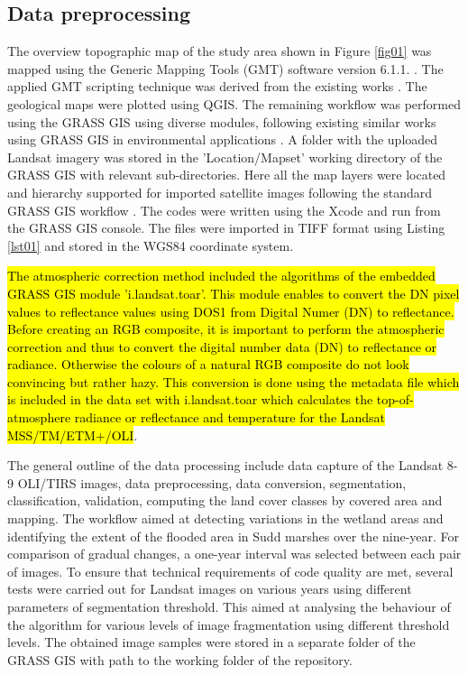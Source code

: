 \documentclass[analytics,article,submit,pdftex,moreauthors]{Definitions/mdpi}
\begin{document}
\subsection{Data preprocessing}

The overview topographic map of the study area shown in Figure \ref{fig01} was mapped using the Generic Mapping Tools (GMT) software version 6.1.1. \cite{Wessel}. The applied GMT scripting technique was derived from the existing works \cite{Lemenkova202203,data7060074}. The geological maps were plotted using QGIS. The remaining workflow was performed using the GRASS GIS using diverse modules, following existing similar works using GRASS GIS in environmental applications \cite{HOFIERKA201720,JASIEWICZ20111162,JASIEWICZ20111525,SOROKINE2007685}. A folder with the uploaded Landsat imagery was stored in the 'Location/Mapset' working directory of the GRASS GIS with relevant sub-directories. Here all the map layers were located and hierarchy supported for imported satellite images following the standard GRASS GIS workflow \cite{NETELER2012124}. The codes were written using the Xcode and run from the GRASS GIS console. The files were imported in TIFF format using Listing \ref{lst01} and stored in the WGS84 coordinate system. 

\hl{The atmospheric correction method included the algorithms of the embedded GRASS GIS module 'i.landsat.toar'. This module enables to convert the DN pixel values to reflectance values using DOS1 from Digital Numer (DN) to reflectance. Before creating an RGB composite, it is important to perform the atmospheric correction and thus to convert the digital number data (DN) to reflectance or radiance. Otherwise the colours of a natural RGB composite do not look convincing but rather hazy. This conversion is done using the metadata file which is included in the data set with i.landsat.toar which calculates the top-of-atmosphere radiance or reflectance and temperature for the Landsat MSS/TM/ETM+/OLI}.

The general outline of the data processing include data capture of the Landsat 8-9 OLI/TIRS images, data preprocessing, data conversion, segmentation, classification, validation, computing the land cover classes by covered area and mapping. The workflow aimed at detecting variations in the wetland areas and identifying the extent of the flooded area in Sudd marshes over the nine-year. For comparison of gradual changes, a one-year interval was selected between each pair of images. To ensure that technical requirements of code quality are met, several tests were carried out for Landsat images on various years using different parameters of segmentation threshold. This aimed at analysing the behaviour of the algorithm for various levels of image fragmentation using different threshold levels. The obtained image samples were stored in a separate folder of the GRASS GIS with path to the working folder of the repository.
\end{document}
